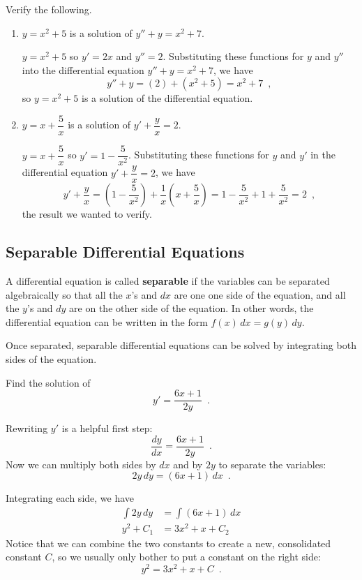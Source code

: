 \begin{example}
Verify the following.
  \begin{enumerate}[label=(\alph*)]
    \item $y=x^2+5$ is a solution of $y''+y=x^2+7$.

    \begin{solution}
      $y=x^2+5$ so $y'=2x$ and $y''=2$. Substituting these functions for $y$ and $y''$ into the differential equation $y''+y=x^2+7$, we have
        $$y''+y=(2)+(x^2+5)=x^2+7 \enspace ,$$
    so $y=x^2+5$ is a solution of the differential equation.
    \end{solution}

    \item $y=x + \dfrac{5}{x}$ is a solution of $y' + \dfrac{y}{x}=2$.

    \begin{solution}
    $y=x+\dfrac{5}{x}$ so $y'=1-\dfrac{5}{x^2}$. Substituting these functions for $y$ and $y'$ in the differential equation $y'+\dfrac{y}{x}=2$, we have
    $$y' + \dfrac{y}{x} = \left(1-\dfrac{5}{x^2}\right) + \dfrac{1}{x}\left(x + \dfrac{5}{x}\right) = 1 - \dfrac{5}{x^2} + 1 + \dfrac{5}{x^2} = 2 \enspace ,$$
    the result we wanted to verify.

    \end{solution}
  \end{enumerate}
\end{example}

\subsection{Separable Differential Equations}
A differential equation is called {\bf separable} if the variables can be separated algebraically so that all the $x$'s and $dx$ are one one side of the equation, and all the $y$'s and $dy$ are on the other side of the equation. In other words, the differential equation can be written in the form $f(x)\,dx = g(y)\,dy$.

Once separated, separable differential equations can be solved by integrating both sides of the equation.

\begin{example}
Find the solution of
$$y'=\frac{6x+1}{2y} \enspace .$$

\begin{solution}
  Rewriting $y'$ is a helpful first step:
$$\frac{dy}{dx} = \frac{6x+1}{2y} \enspace .$$
Now we can multiply both sides by $dx$ and by $2y$ to separate the variables:
$$ 2y\, dy = (6x+1)\, dx \enspace .$$

Integrating each side, we have
\begin{align*}
  \int 2y\,dy &= \int (6x+1)\,dx \\
  y^2+C_1     &= 3x^2+x+C_2
\end{align*}
Notice that we can combine the two constants to create a new, consolidated constant $C$, so we usually only bother to put a constant on the right side:
$$y^2 = 3x^2+x + C \enspace .$$
\end{solution}\end{example}

